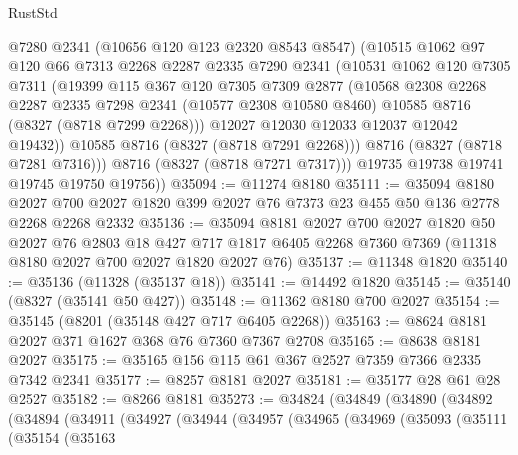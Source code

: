\begin{lexlean}{RustStd}
\begin{coremodule}
            @7280
            @2341
            (@10656 @120 @123 @2320 @8543 @8547)
            (@10515
              @1062
              @97
              @120
              @66
              @7313
              @2268
              @2287
              @2335
              @7290
              @2341
              (@10531
                @1062
                @120
                @7305
                @7311
                (@19399
                  @115
                  @367
                  @120
                  @7305
                  @7309
                  @2877
                  (@10568
                    @2308
                    @2268
                    @2287
                    @2335
                    @7298
                    @2341
                    (@10577 @2308 @10580 @8460)
                    @10585
                    @8716
                    (@8327 (@8718 @7299 @2268)))
                  @12027
                  @12030
                  @12033
                  @12037
                  @12042
                  @19432))
              @10585
              @8716
              (@8327 (@8718 @7291 @2268)))
            @8716
            (@8327 (@8718 @7281 @7316)))
          @8716
          (@8327 (@8718 @7271 @7317)))
        @19735
        @19738
        @19741
        @19745
        @19750
        @19756))
@35094 := @11274 @8180
@35111 := @35094
    @8180
    @2027
    @700
    @2027
    @1820
    @399
    @2027
    @76
    @7373
    @23
    @455
    @50
    @136
    @2778
    @2268
    @2268
    @2332
@35136 := @35094
    @8181
    @2027
    @700
    @2027
    @1820
    @50
    @2027
    @76
    @2803
    @18
    @427
    @717
    @1817
    @6405
    @2268
    @7360
    @7369
    (@11318 @8180 @2027 @700 @2027 @1820 @2027 @76)
@35137 := @11348 @1820
@35140 := @35136 (@11328 (@35137 @18))
@35141 := @14492 @1820
@35145 := @35140 (@8327 (@35141 @50 @427))
@35148 := @11362 @8180 @700 @2027
@35154 := @35145 (@8201 (@35148 @427 @717 @6405 @2268))
@35163 := @8624 @8181 @2027 @371 @1627 @368 @76 @7360 @7367 @2708
@35165 := @8638 @8181 @2027
@35175 := @35165 @156 @115 @61 @367 @2527 @7359 @7366 @2335 @7342 @2341
@35177 := @8257 @8181 @2027
@35181 := @35177 @28 @61 @28 @2527
@35182 := @8266 @8181
@35273 := @34824
    (@34849
      (@34890
        (@34892
          (@34894
            (@34911
              (@34927
                (@34944
                  (@34957
                    (@34965
                      (@34969
                        (@35093
                          (@35111
                            (@35154
                              (@35163

\end{coremodule}
\end{lexlean}
